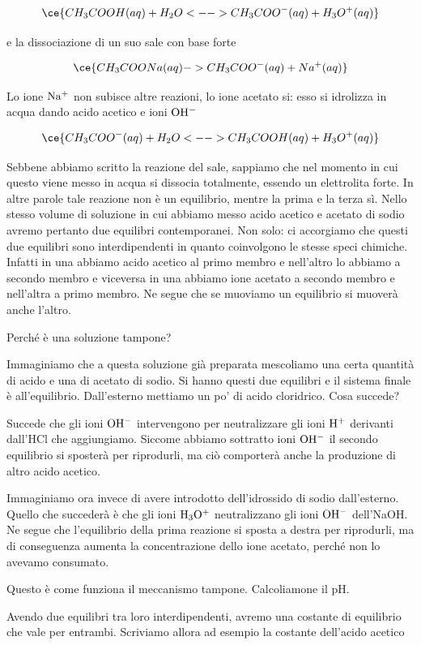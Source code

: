 $$\ce{CH_3COOH(aq) + H_2O <--> CH_3COO^-(aq) + H_3O^+(aq)}$$

e la dissociazione di un suo sale con base forte

$$\ce{CH_3COONa(aq) -> CH_3COO^-(aq) + Na^+(aq)}$$

Lo ione $\rm Na^+$ non subisce altre reazioni, lo ione acetato si: esso si idrolizza in acqua dando acido acetico e ioni $\rm OH^-$

$$\ce{CH_3COO^-(aq) + H_2O <--> CH_3COOH(aq) + H_3O^+(aq)}$$

Sebbene abbiamo scritto la reazione del sale, sappiamo che  nel momento in cui questo viene messo in acqua si dissocia totalmente, essendo un elettrolita forte. In altre parole tale reazione non è un equilibrio, mentre la prima e la terza sì. Nello stesso volume di soluzione in cui abbiamo messo acido acetico e acetato di sodio avremo pertanto due equilibri contemporanei. Non solo: ci accorgiamo che questi due equilibri sono interdipendenti in quanto coinvolgono le stesse speci chimiche. Infatti in una abbiamo acido acetico al primo membro e nell'altro lo abbiamo a secondo membro e viceversa in una abbiamo ione acetato a secondo membro e nell'altra a primo membro. Ne segue che se muoviamo un equilibrio si muoverà anche l'altro.

Perché è una soluzione tampone?

Immaginiamo che a questa soluzione già preparata mescoliamo una certa quantità di acido e una di acetato di sodio. Si hanno questi due equilibri e il sistema finale è all'equilibrio. Dall'esterno mettiamo un po' di acido cloridrico. Cosa succede?

Succede che gli ioni $\rm OH^-$ intervengono per neutralizzare gli ioni $\rm H^+$ derivanti dall'HCl che aggiungiamo. Siccome abbiamo sottratto ioni $\rm OH^-$ il secondo equilibrio si sposterà per riprodurli, ma ciò comporterà anche la produzione di altro acido acetico.

Immaginiamo ora invece di avere introdotto dell'idrossido di sodio dall'esterno. Quello che succederà è che gli ioni $\rm H_3O^+$ neutralizzano gli ioni $\rm OH^-$ dell'NaOH. Ne segue che l'equilibrio della prima reazione si sposta a destra per riprodurli, ma di conseguenza aumenta la concentrazione dello ione acetato, perché non lo avevamo consumato.

Questo è come funziona il meccanismo tampone. Calcoliamone il pH.

Avendo due equilibri tra loro interdipendenti, avremo una costante di equilibrio che vale per entrambi. Scriviamo allora ad esempio la costante dell'acido acetico

